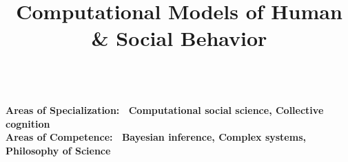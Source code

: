 \documentclass[10pt,a4paper,dvipsnames]{moderncv}
\title{Computational Models of Human \& Social Behavior}
\begin{document}
\hypersetup{
colorlinks=true,
linkcolor=DarkGreen,
urlcolor=DarkGreen,
,citecolor=Green
,citebordercolor=Green
,urlbordercolor=Green
}


\newcommand{\cvdoublecolumn}[2]{%
  \cvitem[0.75em]{}{%
    \begin{minipage}[t]{\listdoubleitemcolumnwidth}#1\end{minipage}%
    \hfill%
    \begin{minipage}[t]{\listdoubleitemcolumnwidth}#2\end{minipage}%
    }%
}

\newcommand{\cvreference}[8]{%
    \textbf{#1}\newline%
    \ifthenelse{\equal{#2}{}}{}{\addresssymbol~#2\newline}%
    \ifthenelse{\equal{#3}{}}{}{#3\newline}%
    \ifthenelse{\equal{#4}{}}{}{#4\newline}%
    \ifthenelse{\equal{#5}{}}{}{#5\newline}%
    \ifthenelse{\equal{#6}{}}{}{\emailsymbol~\texttt{#6}\newline}%
    \ifthenelse{\equal{#7}{}}{}{\phonesymbol~#7\newline}%
    \ifthenelse{\equal{#8}{}}{}{\homepagesymbol~#8}}


\maketitle

~\\
\textbf{\textcolor{moderncvgreen}{Areas of Specialization:} \ Computational social science, Collective cognition} \\
\textbf{\textcolor{moderncvgreen}{Areas of Competence:} \ Bayesian inference, Complex systems, Philosophy of Science}

\vspace{1em}
\end{document}
